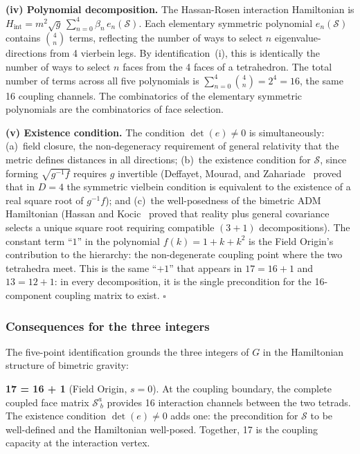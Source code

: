 \documentclass[aps,prd,preprint,superscriptaddress,showpacs,preprintnumbers,amsmath,amssymb,nofootinbib]{revtex4-2}
\begin{document}
\textbf{(iv) Polynomial decomposition.} The Hassan-Rosen interaction Hamiltonian is $H_{\text{int}} = m^2\sqrt{g}\,\sum_{n=0}^{4}\beta_n\,e_n(\mathcal{S})$. Each elementary symmetric polynomial $e_n(\mathcal{S})$ contains $\binom{4}{n}$ terms, reflecting the number of ways to select $n$ eigenvalue-directions from 4 vierbein legs. By identification~(i), this is identically the number of ways to select $n$ faces from the 4 faces of a tetrahedron. The total number of terms across all five polynomials is $\sum_{n=0}^{4}\binom{4}{n} = 2^4 = 16$, the same 16 coupling channels. The combinatorics of the elementary symmetric polynomials are the combinatorics of face selection.

\textbf{(v) Existence condition.} The condition $\det(e) \neq 0$ is simultaneously: (a)~field closure, the non-degeneracy requirement of general relativity that the metric defines distances in all directions; (b)~the existence condition for $\mathcal{S}$, since forming $\sqrt{g^{-1}f}$ requires $g$ invertible (Deffayet, Mourad, and Zahariade~\cite{deffayet2013} proved that in $D = 4$ the symmetric vielbein condition is equivalent to the existence of a real square root of $g^{-1}f$); and (c)~the well-posedness of the bimetric ADM Hamiltonian (Hassan and Kocic~\cite{hassankocic2018} proved that reality plus general covariance selects a unique square root requiring compatible $(3{+}1)$ decompositions). The constant term ``$1$'' in the polynomial $f(k) = 1 + k + k^2$ is the Field Origin's contribution to the hierarchy: the non-degenerate coupling point where the two tetrahedra meet. This is the same ``$+1$'' that appears in $17 = 16 + 1$ and $13 = 12 + 1$: in every decomposition, it is the single precondition for the 16-component coupling matrix to exist. \hfill$\square$

\subsubsection*{Consequences for the three integers}

The five-point identification grounds the three integers of $G$ in the Hamiltonian structure of bimetric gravity:

\textbf{17 = 16 + 1} (Field Origin, $s = 0$). At the coupling boundary, the complete coupled face matrix $\mathcal{S}^a_{\;b}$ provides 16 interaction channels between the two tetrads. The existence condition $\det(e) \neq 0$ adds one: the precondition for $\mathcal{S}$ to be well-defined and the Hamiltonian well-posed. Together, 17 is the coupling capacity at the interaction vertex.
\end{document}
